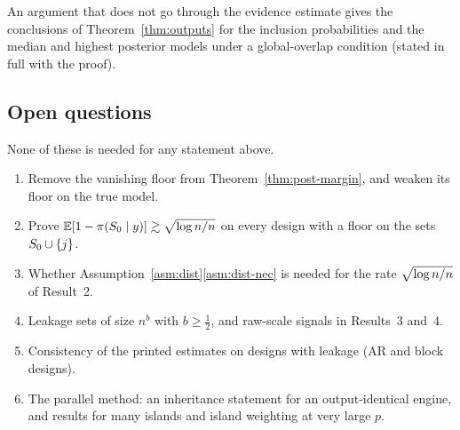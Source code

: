 \begin{remark}\label{rem:alt-route}
An argument that does not go through the evidence estimate gives the conclusions of Theorem~\ref{thm:outputs} for the
inclusion probabilities and the median and highest posterior models under a global-overlap condition (stated in full with
the proof).
\end{remark}


\subsection{Open questions}\label{sec:open}

None of these is needed for any statement above.
\begin{enumerate}[leftmargin=1.5em,itemsep=1pt]
  \item Remove the vanishing floor  from Theorem~\ref{thm:post-margin}, and weaken its floor on the true model.
  \item Prove $\operatorname{\mathbb{E}}[1-\pi(S_0\mid y)]\gtrsim\sqrt{\log n/n}$ on every design with a floor on the sets $S_0\cup\{j\}$.
  \item Whether Assumption~\ref{asm:dist}\ref{asm:dist-nec} is needed for the rate $\sqrt{\log n/n}$ of Result~2.
  \item Leakage sets of size $n^b$ with $b\ge\tfrac12$, and raw-scale signals in Results~3 and~4.
  \item Consistency of the printed estimates on designs with leakage (AR and block designs).
  \item The parallel method: an inheritance statement for an output-identical engine, and results for many islands and
    island weighting at very large $p$.
\end{enumerate}
